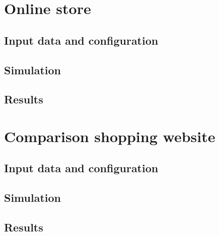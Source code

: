 \section{Online store}

\subsection{Input data and configuration}
\subsection{Simulation}
\subsection{Results}

\section{Comparison shopping website}

\subsection{Input data and configuration}
\subsection{Simulation}
\subsection{Results}

